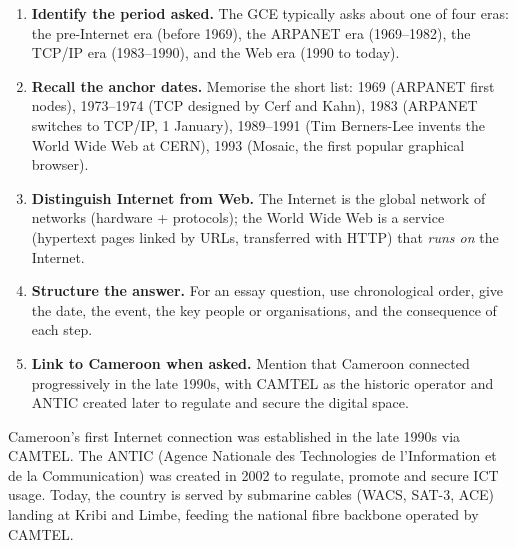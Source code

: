 \documentclass[11pt]{article}
\newcommand{\cle}[1]{{\popxbold\color{popdark}#1}}
\begin{document}
\begin{methode}
\begin{enumerate}
\item \textbf{Identify the period asked.} The GCE typically asks about one of four eras: the pre-Internet era (before 1969), the ARPANET era (1969--1982), the TCP/IP era (1983--1990), and the Web era (1990 to today).
\item \textbf{Recall the anchor dates.} Memorise the short list: 1969 (ARPANET first nodes), 1973--1974 (TCP designed by Cerf and Kahn), 1983 (ARPANET switches to TCP/IP, 1 January), 1989--1991 (Tim Berners-Lee invents the World Wide Web at CERN), 1993 (Mosaic, the first popular graphical browser).
\item \textbf{Distinguish Internet from Web.} The \cle{Internet} is the global network of networks (hardware + protocols); the \cle{World Wide Web} is a service (hypertext pages linked by URLs, transferred with HTTP) that \emph{runs on} the Internet.
\item \textbf{Structure the answer.} For an essay question, use chronological order, give the date, the event, the key people or organisations, and the consequence of each step.
\item \textbf{Link to Cameroon when asked.} Mention that Cameroon connected progressively in the late 1990s, with CAMTEL as the historic operator and ANTIC created later to regulate and secure the digital space.
\end{enumerate}
\end{methode}

\begin{savaistu}
Cameroon's first Internet connection was established in the late 1990s via CAMTEL. The \cle{ANTIC} (Agence Nationale des Technologies de l'Information et de la Communication) was created in 2002 to regulate, promote and secure ICT usage. Today, the country is served by submarine cables (WACS, SAT-3, ACE) landing at Kribi and Limbe, feeding the national fibre backbone operated by CAMTEL.
\end{savaistu}
\end{document}
